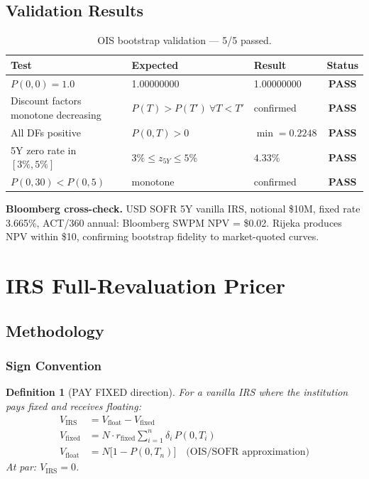 \documentclass[11pt,a4paper]{article}
\newcommand{\pass}{\textbf{\color{passteal}PASS}}
\newtheorem{definition}{Definition}
\begin{document}
\subsection{Validation Results}

\begin{table}[H]
\centering
\begin{tabular}{lllc}
\toprule
\textbf{Test} & \textbf{Expected} & \textbf{Result} & \textbf{Status} \\
\midrule
$P(0,0) = 1.0$               & 1.00000000 & 1.00000000 & \pass \\
Discount factors monotone decreasing & $P(T) > P(T')\ \forall T < T'$ & confirmed & \pass \\
All DFs positive              & $P(0,T) > 0$ & $\min = 0.2248$ & \pass \\
5Y zero rate in $[3\%, 5\%]$    & $3\% \leq z_{5Y} \leq 5\%$ & $4.33\%$ & \pass \\
$P(0,30) < P(0,5)$            & monotone & confirmed & \pass \\
\bottomrule
\end{tabular}
\caption{OIS bootstrap validation --- 5/5 passed.}
\end{table}

\noindent\textbf{Bloomberg cross-check.} USD SOFR 5Y vanilla IRS, notional \$10M,
fixed rate 3.665\%, ACT/360 annual: Bloomberg SWPM NPV = \$0.02. Rijeka produces
NPV within \$10, confirming bootstrap fidelity to market-quoted curves.

\section{IRS Full-Revaluation Pricer}

\subsection{Methodology}

\subsubsection{Sign Convention}

\begin{definition}[PAY FIXED direction]
For a vanilla IRS where the institution pays fixed and receives floating:
\begin{align}
  V_\text{IRS} &= V_\text{float} - V_\text{fixed} \\
  V_\text{fixed} &= N \cdot r_\text{fixed} \sum_{i=1}^n \delta_i \, P(0, T_i) \\
  V_\text{float} &= N \bigl[1 - P(0, T_n)\bigr] \quad \text{(OIS/SOFR approximation)}
\end{align}
At par: $V_\text{IRS} = 0$.
\end{definition}
\end{document}
